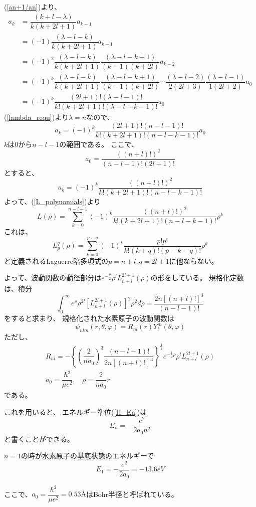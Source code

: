 (\ref{an+1/an})より、
\begin{align}
	a_k &= \dfrac{(k+l-\lambda)}{k(k+2l+1)}a_{k-1} \\
			&= (-1)\dfrac{(\lambda-l-k)}{k(k+2l+1)}a_{k-1} \\
			&= (-1)^2\dfrac{(\lambda-l-k)}{k(k+2l+1)}\dfrac{(\lambda-l-k+1)}{(k-1)(k+2l)}a_{k-2} \\
			&= (-1)^k\dfrac{(\lambda-l-k)}{k(k+2l+1)}\dfrac{(\lambda-l-k+1)}{(k-1)(k+2l)}
			\cdots\dfrac{(\lambda-l-2)}{2(2l+3)}\dfrac{(\lambda-l-1)}{1(2l+2)}a_0 \\
			&= (-1)^k\dfrac{(2l+1)!(\lambda-l-1)!}{k!(k+2l+1)!(\lambda-l-k-1)!}a_0
\end{align}
(\ref{lambda_requ})より$\lambda = n$なので、
\begin{equation}
	a_k = (-1)^k\dfrac{(2l+1)!(n-l-1)!}{k!(k+2l+1)!(n-l-k-1)!}a_0
\end{equation}
$k$は$0$から$n-l-1$の範囲である。
ここで、
\begin{equation}
	a_0 = \dfrac{((n+l)!)^2}{(n−l−1)!(2l+1)!}
\end{equation}
とすると、
\begin{equation}
	a_k = (-1)^{k}\dfrac{((n+l)!)^2}{k!(k+2l+1)!(n-l-k-1)!}
\end{equation}
よって、(\ref{L_polynomials})より
\begin{equation}
	L(\rho) = \sum_{k=0}^{n-l-1}(-1)^{k}\dfrac{((n+l)!)^2}{k!(k+2l+1)!(n-l-k-1)!}\rho^k
\end{equation}
これは、
\begin{equation}
	L_p^q(\rho) = \sum_{k = 0}^{p-q} (-1)^{k} \dfrac{p!p!}{k!(k+q)!(p-k-q)!}\rho^k
\end{equation}
と定義されるLaguerre陪多項式の$p = n+l,q = 2l+1$に他ならない。

よって、波動関数の動径部分は$e^{-\frac{\rho}{2}}\rho^l L_{n+l}^{2l+1}(\rho)$の形をしている。
規格化定数は、積分
\begin{equation}
	\int_0^\infty e^\rho \rho^{2l} [L_{n+l}^{2l+1}(\rho)]^2 \rho^2 d\rho
	= \dfrac{2n[(n+l)!]^3}{(n-l-1)!}
\end{equation}
をすると求まり、
規格化された水素原子の波動関数は
\begin{equation}
	\psi_{nlm}(r,\theta,\varphi) = R_{nl}(r)Y_l^m(\theta,\varphi)
\end{equation}
ただし、
\begin{align}
	R_{nl} = - \left\{ \left(\dfrac{2}{na_0}\right)^3\dfrac{(n-l-1)!}{2n[(n+l)!]^3}\right\}^{\frac{1}{2}}e^{-\frac{1}{2}\rho}\rho^l L_{n+l}^{2l+1}(\rho) \\
	a_0 = \dfrac{\hbar^2}{\mu e^2},~~~~\rho = \dfrac{2}{n a_0}r
\end{align}
である。

これを用いると、
エネルギー準位(\ref{H_En})は
\begin{equation}
	E_n = -\dfrac{e^2}{2a_0n^2}
\end{equation}
と書くことができる。

$n = 1$の時が水素原子の基底状態のエネルギーで
\begin{equation}
	E_1 = -\dfrac{e^2}{2a_0} = -13.6 \si{eV}
\end{equation}

ここで、$a_0 = \dfrac{\hbar^2}{\mu e^2} = 0.53 \text{\AA}$はBohr半径と呼ばれている。
